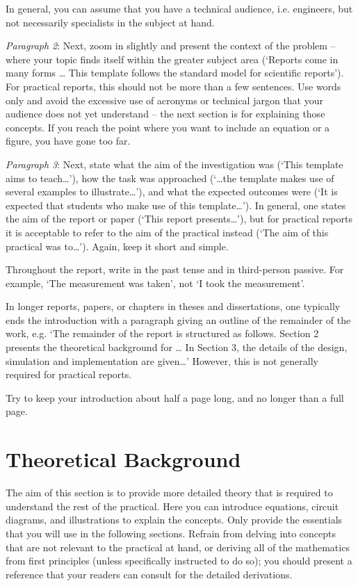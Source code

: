 \documentclass[a4paper, onecolumn, 12pt]{IEEEtran}
\begin{document}
In general, you can assume that you have a technical audience, i.e. engineers, but not necessarily specialists in the subject at hand.

\textit{Paragraph 2}: Next, zoom in slightly and present the context of the problem – where your topic finds itself within the greater subject area (`Reports come in many forms … This template follows the standard model for scientific reports'). For practical reports, this should not be more than a few sentences. Use words only and avoid the excessive use of acronyms or technical jargon that your audience does not yet understand – the next section is for explaining those concepts. If you reach the point where you want to include an equation or a figure, you have gone too far.

\textit{Paragraph 3}: Next, state what the aim of the investigation was (`This template aims to teach…'), how the task was approached (`…the template makes use of several examples to illustrate…'), and what the expected outcomes were (`It is expected that students who make use of this template…'). In general, one states the aim of the report or paper (`This report presents…'), but for practical reports it is acceptable to refer to the aim of the practical instead (`The aim of this practical was to…'). Again, keep it short and simple.

Throughout the report, write in the past tense and in third-person passive. For example, `The measurement was taken', not `I took the measurement'.

In longer reports, papers, or chapters in theses and dissertations, one typically ends the introduction with a paragraph giving an outline of the remainder of the work, e.g. `The remainder of the report is structured as follows. Section 2 presents the theoretical background for … In Section 3, the details of the design, simulation and implementation are given…' However, this is not generally required for practical reports.

Try to keep your introduction about half a page long, and no longer than a full page.

\section{Theoretical Background}
\label{sec:theoretical_background}

The aim of this section is to provide more detailed theory that is required to understand the rest of the practical. Here you can introduce equations, circuit diagrams, and illustrations to explain the concepts. Only provide the essentials that you will use in the following sections. Refrain from delving into concepts that are not relevant to the practical at hand, or deriving all of the mathematics from first principles (unless specifically instructed to do so); you should present a reference that your readers can consult for the detailed derivations.
\end{document}
